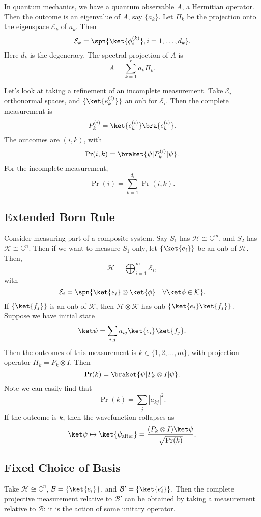 \documentclass[12pt]{article}
\begin{document}
In quantum mechanics, we have a quantum observable $A$, a Hermitian operator. Then the outcome is an eigenvalue of $A$, say $\{a_k\}$. Let $\Pi_k$ be the projection onto the eigenspace $\mathcal{E}_k$ of $a_k$. Then
\[
	\mathcal{E}_k = \spn\{\ket{\phi_i^{(k)}}, i = 1, \ldots, d_k\}.
\]
Here $d_k$ is the degeneracy. The spectral projection of $A$ is
\[
A = \sum_{k = 1}^r a_k \Pi_k.
\]


Let's look at taking a refinement of an incomplete measurement. Take $\mathcal{E}_i$ orthonormal spaces, and $\{\ket{e_k^{(i)}}\}$ an onb for $\mathcal{E}_i$. Then the complete measurement is
\[
	P_k^{(i)} = \ket{e_k^{(i)}} \bra{e_k^{(i)}}.
\]
The outcomes are $(i, k)$, with
\[
	\Pr(i, k) = \braket{\psi|P_k^{(i)}|\psi}.
\]
For the incomplete measurement,
\[
\Pr(i) = \sum_{k = 1}^{d_i} \Pr(i, k).
\]


\subsection{Extended Born Rule}
\label{sub:ex_born}

Consider measuring part of a composite system. Say $S_1$ has $\mathcal{H} \cong \mathbb{C}^m$, and $S_2$ has $\mathcal{K} \cong \mathbb{C}^n$. Then if we want to measure $S_1$ only, let $\{\ket{e_i}\}$ be an onb of $\mathcal{H}$. Then,
\[
\mathcal{H} = \bigoplus_{i = 1}^m \mathcal{E}_i,
\]
with
\[
	\mathcal{E}_i = \spn\{ \ket{e_i} \otimes \ket{\phi} \quad \forall \ket \phi \in \mathcal{K}\}.
\]
If $\{\ket {f_j}\}$ is an onb of $\mathcal{K}$, then $\mathcal{H} \otimes \mathcal{K}$ has onb $\{\ket{e_i} \ket{f_j}\}$. Suppose we have initial state
\[
	\ket \psi = \sum_{i, j} a_{ij} \ket{e_i} \ket{f_j}.
\]
Then the outcomes of this measurement is $k \in \{1, 2, \ldots, m\}$, with projection operator $\Pi_k = P_k \otimes I$. Then
\[
	\Pr(k) = \braket{\psi | P_k \otimes I | \psi}.
\]
Note we can easily find that
\[
\Pr(k) = \sum_j |a_{kj}|^2.
\]
If the outcome is $k$, then the wavefunction collapses as
\[
	\ket \psi \mapsto \ket{\psi_{\mathrm{after}}} = \frac{(P_k \otimes I)\ket \psi}{\sqrt{\Pr(k)}}.
\]

\subsection{Fixed Choice of Basis}
\label{sub:fix_bas}

Take $\mathcal{H} \cong \mathbb{C}^n$, $\mathcal{B} = \{\ket{e_i}\}$, and $\mathcal{B}' = \{\ket{e_i'}\}$. Then the complete projective measurement relative to $\mathcal{B}'$ can be obtained by taking a measurement relative to $\mathcal{B}$: it is the action of some unitary operator.
\end{document}
